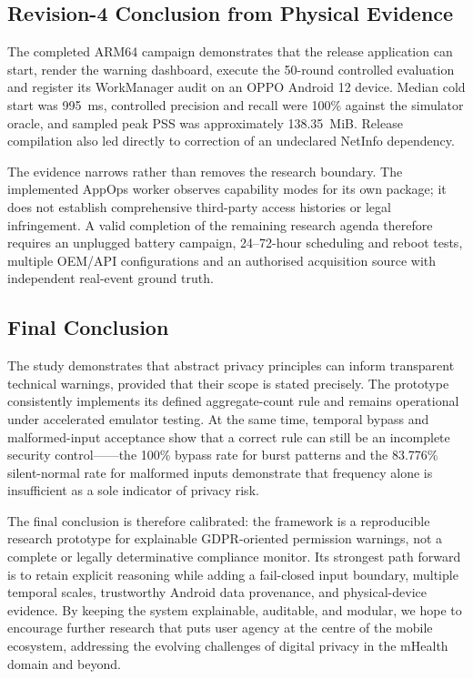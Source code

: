 \subsection{Revision-4 Conclusion from Physical Evidence}

The completed ARM64 campaign demonstrates that the release application can start, render the warning dashboard, execute the 50-round controlled evaluation and register its WorkManager audit on an OPPO Android 12 device. Median cold start was 995~ms, controlled precision and recall were 100\% against the simulator oracle, and sampled peak PSS was approximately 138.35~MiB. Release compilation also led directly to correction of an undeclared NetInfo dependency.

The evidence narrows rather than removes the research boundary. The implemented AppOps worker observes capability modes for its own package; it does not establish comprehensive third-party access histories or legal infringement. A valid completion of the remaining research agenda therefore requires an unplugged battery campaign, 24--72-hour scheduling and reboot tests, multiple OEM/API configurations and an authorised acquisition source with independent real-event ground truth.

\subsection{Final Conclusion}

The study demonstrates that abstract privacy principles can inform transparent technical warnings, provided that their scope is stated precisely. The prototype consistently implements its defined aggregate-count rule and remains operational under accelerated emulator testing. At the same time, temporal bypass and malformed-input acceptance show that a correct rule can still be an incomplete security control——the 100\% bypass rate for burst patterns and the 83.776\% silent-normal rate for malformed inputs demonstrate that frequency alone is insufficient as a sole indicator of privacy risk.

The final conclusion is therefore calibrated: the framework is a reproducible research prototype for explainable GDPR-oriented permission warnings, not a complete or legally determinative compliance monitor. Its strongest path forward is to retain explicit reasoning while adding a fail-closed input boundary, multiple temporal scales, trustworthy Android data provenance, and physical-device evidence. By keeping the system explainable, auditable, and modular, we hope to encourage further research that puts user agency at the centre of the mobile ecosystem, addressing the evolving challenges of digital privacy in the mHealth domain and beyond.
